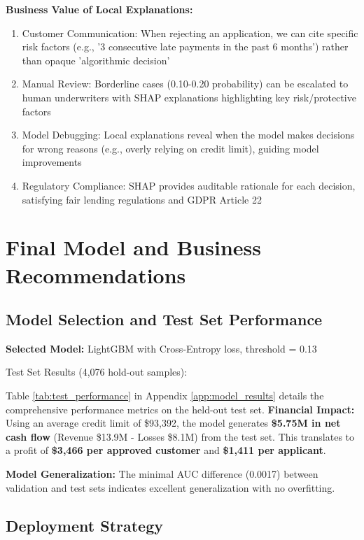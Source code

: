 \documentclass[12pt]{article}
\begin{document}
\textbf{Business Value of Local Explanations:}

\begin{enumerate}
    \item Customer Communication: When rejecting an application, we can cite specific risk factors (e.g., '3 consecutive late payments in the past 6 months') rather than opaque 'algorithmic decision'
    \item Manual Review: Borderline cases (0.10-0.20 probability) can be escalated to human underwriters with SHAP explanations highlighting key risk/protective factors
    \item Model Debugging: Local explanations reveal when the model makes decisions for wrong reasons (e.g., overly relying on credit limit), guiding model improvements
    \item Regulatory Compliance: SHAP provides auditable rationale for each decision, satisfying fair lending regulations and GDPR Article 22
\end{enumerate}

\section{Final Model and Business Recommendations}

\subsection{Model Selection and Test Set Performance}

\textbf{Selected Model:} LightGBM with Cross-Entropy loss, threshold = 0.13

Test Set Results (4,076 hold-out samples):

Table \ref{tab:test_performance} in Appendix \ref{app:model_results} details the comprehensive performance metrics on the held-out test set.
\textbf{Financial Impact:}
Using an average credit limit of \$93,392, the model generates \textbf{\$5.75M in net cash flow} (Revenue \$13.9M - Losses \$8.1M) from the test set. This translates to a profit of \textbf{\$3,466 per approved customer} and \textbf{\$1,411 per applicant}.

\textbf{Model Generalization:} The minimal AUC difference (0.0017) between validation and test sets indicates excellent generalization with no overfitting.

\subsection{Deployment Strategy}
\end{document}
